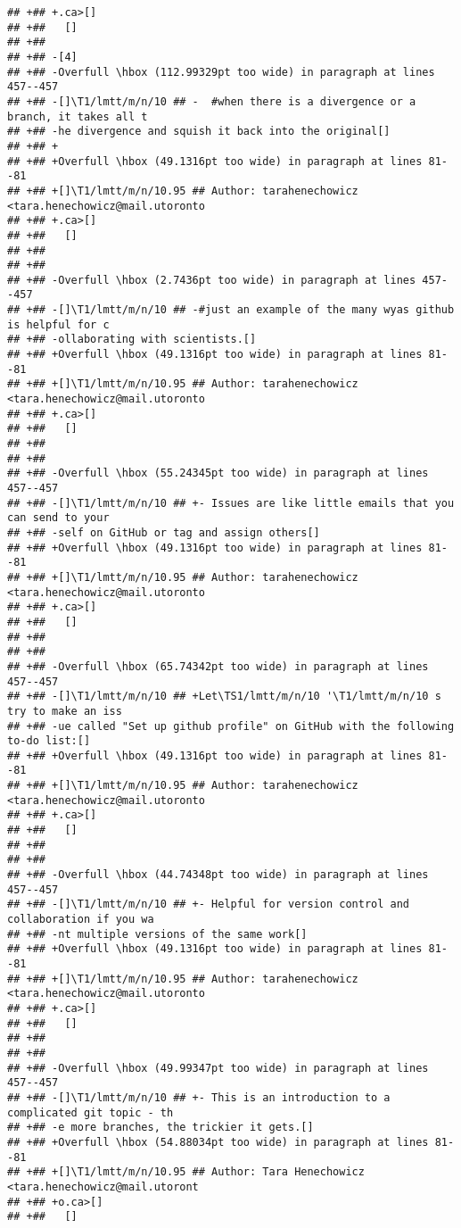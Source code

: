 \documentclass[ignorenonframetext,]{beamer}
\begin{document}
\begin{verbatim}
## +## +.ca>[] 
## +##   []
## +##  
## +## -[4]
## +## -Overfull \hbox (112.99329pt too wide) in paragraph at lines 457--457
## +## -[]\T1/lmtt/m/n/10 ## -  #when there is a divergence or a branch, it takes all t
## +## -he divergence and squish it back into the original[] 
## +## +
## +## +Overfull \hbox (49.1316pt too wide) in paragraph at lines 81--81
## +## +[]\T1/lmtt/m/n/10.95 ## Author: tarahenechowicz <tara.henechowicz@mail.utoronto
## +## +.ca>[] 
## +##   []
## +##  
## +##  
## +## -Overfull \hbox (2.7436pt too wide) in paragraph at lines 457--457
## +## -[]\T1/lmtt/m/n/10 ## -#just an example of the many wyas github is helpful for c
## +## -ollaborating with scientists.[] 
## +## +Overfull \hbox (49.1316pt too wide) in paragraph at lines 81--81
## +## +[]\T1/lmtt/m/n/10.95 ## Author: tarahenechowicz <tara.henechowicz@mail.utoronto
## +## +.ca>[] 
## +##   []
## +##  
## +##  
## +## -Overfull \hbox (55.24345pt too wide) in paragraph at lines 457--457
## +## -[]\T1/lmtt/m/n/10 ## +- Issues are like little emails that you can send to your
## +## -self on GitHub or tag and assign others[] 
## +## +Overfull \hbox (49.1316pt too wide) in paragraph at lines 81--81
## +## +[]\T1/lmtt/m/n/10.95 ## Author: tarahenechowicz <tara.henechowicz@mail.utoronto
## +## +.ca>[] 
## +##   []
## +##  
## +##  
## +## -Overfull \hbox (65.74342pt too wide) in paragraph at lines 457--457
## +## -[]\T1/lmtt/m/n/10 ## +Let\TS1/lmtt/m/n/10 '\T1/lmtt/m/n/10 s try to make an iss
## +## -ue called "Set up github profile" on GitHub with the following to-do list:[] 
## +## +Overfull \hbox (49.1316pt too wide) in paragraph at lines 81--81
## +## +[]\T1/lmtt/m/n/10.95 ## Author: tarahenechowicz <tara.henechowicz@mail.utoronto
## +## +.ca>[] 
## +##   []
## +##  
## +##  
## +## -Overfull \hbox (44.74348pt too wide) in paragraph at lines 457--457
## +## -[]\T1/lmtt/m/n/10 ## +- Helpful for version control and collaboration if you wa
## +## -nt multiple versions of the same work[] 
## +## +Overfull \hbox (49.1316pt too wide) in paragraph at lines 81--81
## +## +[]\T1/lmtt/m/n/10.95 ## Author: tarahenechowicz <tara.henechowicz@mail.utoronto
## +## +.ca>[] 
## +##   []
## +##  
## +##  
## +## -Overfull \hbox (49.99347pt too wide) in paragraph at lines 457--457
## +## -[]\T1/lmtt/m/n/10 ## +- This is an introduction to a complicated git topic - th
## +## -e more branches, the trickier it gets.[] 
## +## +Overfull \hbox (54.88034pt too wide) in paragraph at lines 81--81
## +## +[]\T1/lmtt/m/n/10.95 ## Author: Tara Henechowicz <tara.henechowicz@mail.utoront
## +## +o.ca>[] 
## +##   []

\end{verbatim}
\end{document}

